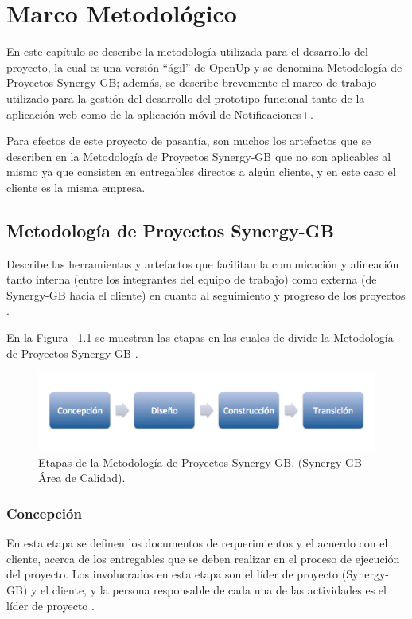 \chapter{Marco Metodológico} \label{chap:Marco Metodologico}

\vspace{5 mm}

En este capítulo se describe la metodología utilizada para el desarrollo del proyecto, la cual es una versión “ágil” de OpenUp y se denomina Metodología de Proyectos Synergy-GB; además, se describe brevemente el marco de trabajo utilizado para la gestión del desarrollo del prototipo funcional tanto de la aplicación web como de la aplicación móvil de Notificaciones+.


Para efectos de este proyecto de pasantía, son muchos los artefactos que se describen en la Metodología de Proyectos Synergy-GB que no son aplicables al mismo ya que consisten en entregables directos a algún cliente, y en este caso el cliente es la misma empresa.


\section{Metodología de Proyectos Synergy-GB} \label{sect:Metodologia Synergy}
Describe las herramientas y artefactos que facilitan la comunicación y alineación tanto interna  (entre los integrantes del equipo de trabajo) como externa (de Synergy-GB hacia el cliente) en cuanto al seguimiento y progreso de los proyectos \cite{MMSynergy}. 

En la Figura ~\ref{fig:metosyn} se muestran las etapas en las cuales de divide la Metodología de Proyectos Synergy-GB \cite{MMSynergy}.

\begin{figure}
  \centering
  \includegraphics[scale=0.7,type=png,ext=.png,read=.png,angle=0,origin=c]{imagenes/metodologiasynergy}
  \caption{Etapas de la Metodología de Proyectos Synergy-GB. 
(Synergy-GB Área de Calidad).}
  \label{fig:metosyn}
\end{figure}

\subsection{Concepción}
En esta etapa se definen los documentos de requerimientos y el acuerdo con el cliente, acerca de los entregables que se deben realizar en el proceso de ejecución del proyecto. Los involucrados en esta etapa son el líder de proyecto (Synergy-GB) y el cliente, y la persona responsable de cada una de las actividades es el líder de proyecto \cite{MMSynergy}.

